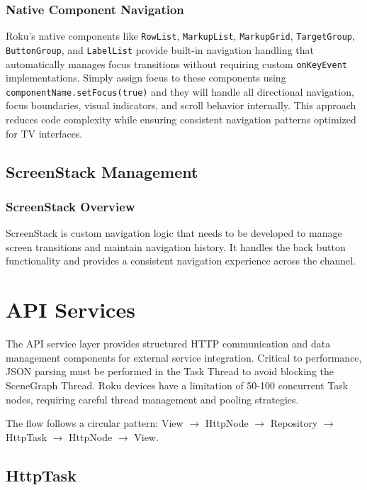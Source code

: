 \documentclass[11pt,letterpaper]{article}
\begin{document}
\subsubsection{Native Component Navigation}
\label{sec:native-navigation}

Roku's native components like \texttt{RowList}, \texttt{MarkupList}, \texttt{MarkupGrid}, \texttt{TargetGroup}, \texttt{ButtonGroup}, and \texttt{LabelList} provide built-in navigation handling that automatically manages focus transitions without requiring custom \texttt{onKeyEvent} implementations. Simply assign focus to these components using \texttt{componentName.setFocus(true)} and they will handle all directional navigation, focus boundaries, visual indicators, and scroll behavior internally. This approach reduces code complexity while ensuring consistent navigation patterns optimized for TV interfaces.

\subsection{ScreenStack Management}
\label{sec:screenstack}

\subsubsection{ScreenStack Overview}
ScreenStack is custom navigation logic that needs to be developed to manage screen transitions and maintain navigation history. It handles the back button functionality and provides a consistent navigation experience across the channel.

\section{API Services}
\label{sec:api-services}

The API service layer provides structured HTTP communication and data management components for external service integration. Critical to performance, JSON parsing must be performed in the Task Thread to avoid blocking the SceneGraph Thread. Roku devices have a limitation of 50-100 concurrent Task nodes, requiring careful thread management and pooling strategies.

The flow follows a circular pattern: View $\rightarrow$ HttpNode $\rightarrow$ Repository $\rightarrow$ HttpTask $\rightarrow$ HttpNode $\rightarrow$ View.

\subsection{HttpTask}
\label{sec:httptask}
\end{document}
